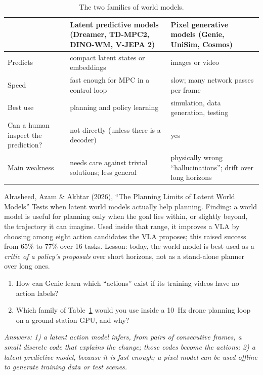 \begin{table}[h]
\centering\small
\begin{tabularx}{\linewidth}{@{}>{\raggedright\arraybackslash}p{3.3cm} >{\raggedright\arraybackslash}X >{\raggedright\arraybackslash}X@{}}
\toprule
 & Latent predictive models (Dreamer, TD-MPC2, DINO-WM, V-JEPA 2) & Pixel generative models (Genie, UniSim, Cosmos) \\
\midrule
Predicts & compact latent states or embeddings & images or video \\
Speed & fast enough for MPC in a control loop & slow; many network passes per frame \\
Best use & planning and policy learning & simulation, data generation, testing \\
Can a human inspect the prediction? & not directly (unless there is a decoder) & yes \\
Main weakness & needs care against trivial solutions; less general & physically wrong ``hallucinations''; drift over long horizons \\
\bottomrule
\end{tabularx}
\caption{The two families of world models.}
\label{tab:wmfam}
\end{table}

\begin{paperbox}{Alrasheed, Azam \& Akhtar (2026), ``The Planning Limits of Latent World Models''}
Tests when latent world models actually help planning. Finding: a world model is useful for planning only when the goal lies within, or slightly beyond, the trajectory it can imagine. Used inside that range, it improves a VLA by choosing among eight action candidates the VLA proposes; this raised success from 65\% to 77\% over 16 tasks. Lesson: today, the world model is best used as a \emph{critic of a policy's proposals} over short horizons, not as a stand-alone planner over long ones.
\end{paperbox}

\begin{quizbox}
\begin{enumerate}[leftmargin=*]
\item How can Genie learn which ``actions'' exist if its training videos have no action labels?
\item Which family of Table~\ref{tab:wmfam} would you use inside a 10~Hz drone planning loop on a ground-station GPU, and why?
\end{enumerate}
\emph{Answers: 1) a latent action model infers, from pairs of consecutive frames, a small discrete code that explains the change; those codes become the actions; 2) a latent predictive model, because it is fast enough; a pixel model can be used offline to generate training data or test scenes.}
\end{quizbox}

